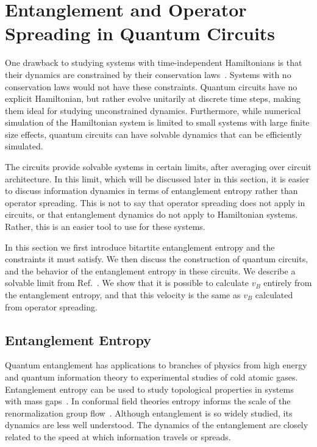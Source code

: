 \section{Entanglement and Operator Spreading in Quantum Circuits} \label{sec:circuits}

One drawback to studying systems with time-independent Hamiltonians is that their dynamics are constrained by their conservation laws~\cite{Jonay18}. Systems with no conservation laws would not have these constraints. Quantum circuits have no explicit Hamiltonian, but rather evolve unitarily at discrete time steps, making them ideal for studying unconstrained dynamics. Furthermore, while numerical simulation of the Hamiltonian system is limited to small systems with large finite size effects, quantum circuits can have solvable dynamics that can be efficiently simulated.

The circuits provide solvable systems in certain limits, after averaging over circuit architecture. In this limit, which will be discussed later in this section, it is easier to discuss information dynamics in terms of entanglement entropy rather than operator spreading. This is not to say that operator spreading does not apply in circuits, or that entanglement dynamics do not apply to Hamiltonian systems. Rather, this is an easier tool to use for these systems.

In this section we first introduce bitartite entanglement entropy and the constraints it must satisfy. We then discuss the construction of quantum circuits, and the behavior of the entanglement entropy in these circuits. We describe a solvable limit from Ref.~\cite{Nahum2017}. We show that it is possible to calculate $v_B$ entirely from the entanglement entropy, and that this velocity is the same as $v_B$ calculated from operator spreading.

\subsection{Entanglement Entropy} \label{sub:intro}

Quantum entanglement has applications to branches of physics from high energy and quantum information theory to experimental studies of cold atomic gases. Entanglement entropy can be used to study topological properties in systems with mass gaps~\cite{Kitaev2006}. In conformal field theories entropy informs the scale of the renormalization group flow~\cite{Casini2011, Myers2011}. Although entanglement is so widely studied, its dynamics are less well understood. The dynamics of the entanglement are closely related to the speed at which information travels or spreads. 

